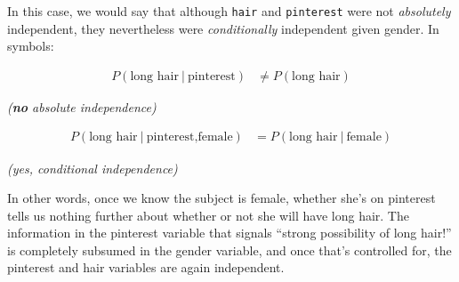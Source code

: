 In this case, we would say that although \texttt{hair} and \texttt{pinterest}
were not \textit{absolutely} independent, they nevertheless were
\textit{conditionally} independent given gender. In symbols:

\vspace{-.15in}
\begin{align*}
P(\textrm{long hair}\ |\ \textrm{pinterest}) &\neq P(\textrm{long hair})
\end{align*}
\vspace{-.5in}
\begin{center}\textsl{(\textbf{no} absolute independence)}\end{center}
\medskip
\begin{align*}
P(\textrm{long hair}\ |\ \textrm{pinterest,female}) &= P(\textrm{long hair}\ |\
\textrm{female})
\end{align*}
\vspace{-.5in}
\begin{center}\textsl{(yes, conditional independence)}\end{center}
\smallskip

In other words, once we know the subject is female, whether she's on pinterest
tells us nothing further about whether or not she will have long hair. The
information in the pinterest variable that signals ``strong possibility of long
hair!'' is completely subsumed in the gender variable, and once that's
controlled for, the pinterest and hair variables are again independent.